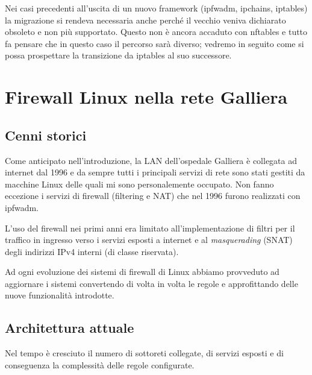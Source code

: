 Nei casi precedenti all'uscita di un nuovo framework (ipfwadm, ipchains, iptables)
la migrazione si rendeva necessaria anche perché il vecchio veniva dichiarato obsoleto
e non più supportato.
Questo non è ancora accaduto con nftables e tutto fa pensare che in questo
caso il percorso sarà diverso; vedremo in seguito come si possa
prospettare la transizione da iptables al suo successore.

\chapter{Firewall Linux nella rete Galliera}

\section{Cenni storici}

Come anticipato nell'introduzione, la LAN dell'ospedale Galliera è collegata
ad internet dal 1996 e da sempre tutti i principali servizi di rete sono stati
gestiti da macchine Linux delle quali mi sono personalemente occupato.
Non fanno eccezione i servizi di firewall (filtering e NAT) che nel 1996
furono realizzati con ipfwadm.

L'uso del firewall nei primi anni era limitato all'implementazione di filtri
per il traffico in ingresso verso i servizi esposti a internet e al {\em
masquerading} (SNAT) degli indirizzi IPv4 interni (di classe riservata).

Ad ogni evoluzione dei sistemi di firewall di Linux abbiamo provveduto ad
aggiornare i sistemi convertendo di volta in volta le regole e approfittando
delle nuove funzionalità introdotte.

\section{Architettura attuale}
Nel tempo è cresciuto il numero di sottoreti collegate, di servizi esposti e
di conseguenza la complessità delle regole configurate.


